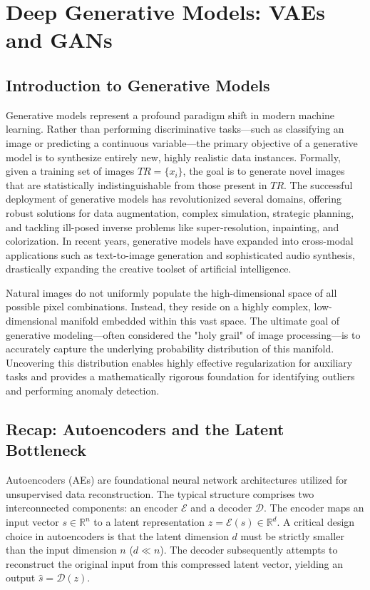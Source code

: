 \chapter{Deep Generative Models: VAEs and GANs}
\label{ch:generative_models}

\section{Introduction to Generative Models}
Generative models represent a profound paradigm shift in modern machine learning. Rather than performing discriminative tasks—such as classifying an image or predicting a continuous variable—the primary objective of a generative model is to synthesize entirely new, highly realistic data instances. Formally, given a training set of images $TR = \{x_i\}$, the goal is to generate novel images that are statistically indistinguishable from those present in $TR$. The successful deployment of generative models has revolutionized several domains, offering robust solutions for data augmentation, complex simulation, strategic planning, and tackling ill-posed inverse problems like super-resolution, inpainting, and colorization. In recent years, generative models have expanded into cross-modal applications such as text-to-image generation and sophisticated audio synthesis, drastically expanding the creative toolset of artificial intelligence.

\begin{insightbox}
Natural images do not uniformly populate the high-dimensional space of all possible pixel combinations. Instead, they reside on a highly complex, low-dimensional manifold embedded within this vast space. The ultimate goal of generative modeling—often considered the "holy grail" of image processing—is to accurately capture the underlying probability distribution of this manifold. Uncovering this distribution enables highly effective regularization for auxiliary tasks and provides a mathematically rigorous foundation for identifying outliers and performing anomaly detection.
\end{insightbox}

\section{Recap: Autoencoders and the Latent Bottleneck}
Autoencoders (AEs) are foundational neural network architectures utilized for unsupervised data reconstruction. The typical structure comprises two interconnected components: an encoder $\mathcal{E}$ and a decoder $\mathcal{D}$. The encoder maps an input vector $s \in \mathbb{R}^n$ to a latent representation $z = \mathcal{E}(s) \in \mathbb{R}^d$. A critical design choice in autoencoders is that the latent dimension $d$ must be strictly smaller than the input dimension $n$ ($d \ll n$). The decoder subsequently attempts to reconstruct the original input from this compressed latent vector, yielding an output $\hat{s} = \mathcal{D}(z)$.

